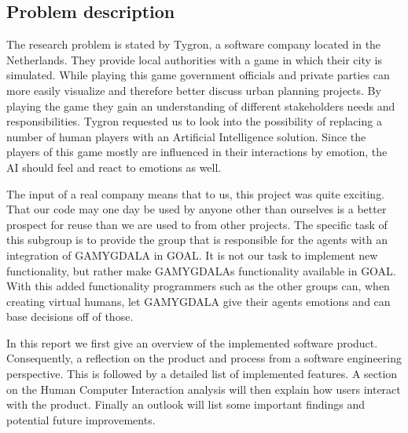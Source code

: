\documentclass[11pt]{article}
\begin{document}
\subsection{Problem description}
The research problem is stated by Tygron\cite{Tygron}, a software company located in the Netherlands. They provide local authorities with a game in which their city is simulated. While playing this game government officials and private parties can more easily visualize and therefore better discuss urban planning projects. By playing the game they gain an understanding of different stakeholders needs and responsibilities. Tygron requested us to look into the possibility of replacing a number of human players with an Artificial Intelligence solution. Since the players of this game mostly are influenced in their interactions by emotion, the AI should feel and react to emotions as well.\par 
The input of a real company means that to us, this project was quite exciting. That our code may one day be used by anyone other than ourselves is a better prospect for reuse than we are used to from other projects. The specific task of this subgroup is to provide the group that is responsible for the agents with an integration of GAMYGDALA in GOAL. It is not our task to implement new functionality, but rather make GAMYGDALAs functionality available in GOAL.  With this added functionality programmers such as the other groups can, when creating virtual humans, let GAMYGDALA give their agents emotions and can base decisions off of those.\par 
In this report we first give an overview of the implemented software product. Consequently, a reflection on the product and process from a software engineering perspective. This is followed by a detailed list of implemented features. A section on the Human Computer Interaction analysis will then explain how users interact with the product. Finally an outlook will list some important findings and potential future improvements.
\end{document}
